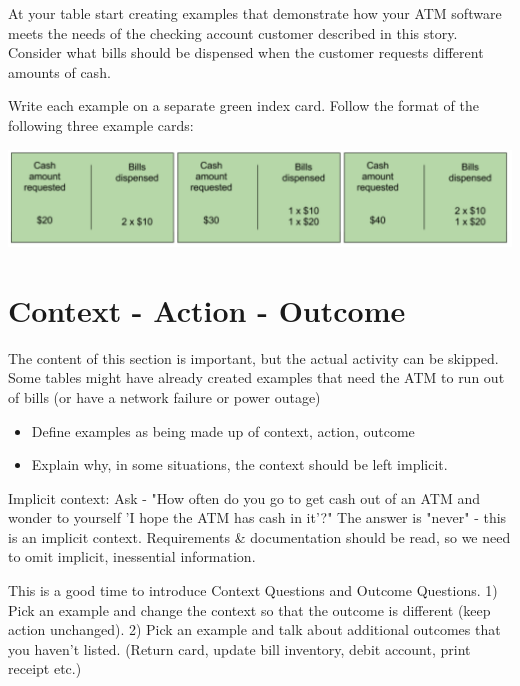     
    At your table start creating examples that demonstrate how your ATM software meets the needs of the checking account customer described in this story. Consider what bills should be dispensed when the customer requests different amounts of cash.
    
    Write each example on a separate green index card. Follow the format of the following three example cards:
    
    \includegraphics[width=\textwidth]{images/atm-example-without-context}
    
    
    


\fi

\chapter*{Context - Action - Outcome}
    
\ifnotes

    The content of this section is important, but the actual activity can be skipped. Some tables might have already created examples that need the ATM to run out of bills (or have a network failure or power outage)
    
    \begin{itemize}
        \item Define examples as being made up of context, action, outcome
        \item Explain why, in some situations, the context should be left implicit.
    \end{itemize}

    Implicit context: Ask - "How often do you go to get cash out of an ATM and wonder to yourself 'I hope the ATM has cash in it'?" The answer is "never" - this is an implicit context. Requirements \& documentation should be read, so we need to omit implicit, inessential information.

    This is a good time to introduce Context Questions and Outcome Questions. 1) Pick an example and change the context so that the outcome is different (keep action unchanged). 2) Pick an example and talk about additional outcomes that you haven't listed. (Return card, update bill inventory, debit account, print receipt etc.)
\fi

